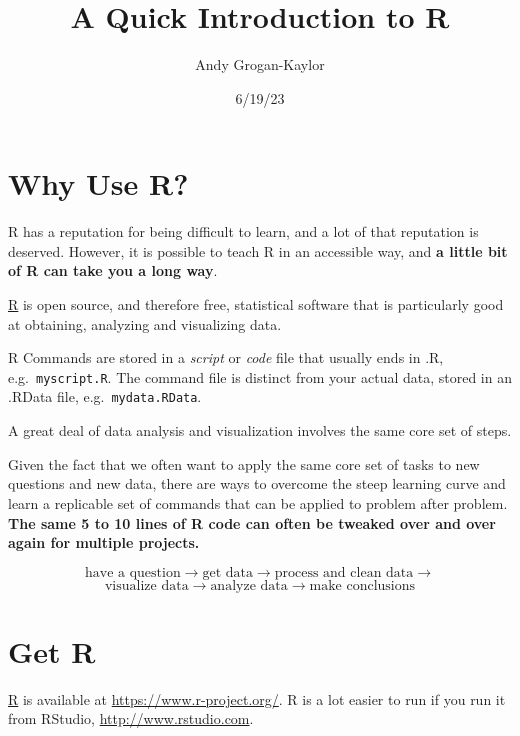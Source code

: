 \documentclass[
  letterpaper,
  DIV=11,
  numbers=noendperiod]{scrartcl}
\title{A Quick Introduction to R}
\author{Andy Grogan-Kaylor}
\date{6/19/23}
\begin{document}
\maketitle
\ifdefined\Shaded\renewenvironment{Shaded}{\begin{tcolorbox}[interior hidden, boxrule=0pt, borderline west={3pt}{0pt}{shadecolor}, frame hidden, enhanced, sharp corners, breakable]}{\end{tcolorbox}}\fi

\hypertarget{why-use-r}{%
\section{Why Use R?}\label{why-use-r}}

R has a reputation for being difficult to learn, and a lot of that
reputation is deserved. However, it is possible to teach R in an
accessible way, and \textbf{a little bit of R can take you a long way}.

\href{https://www.r-project.org/}{R} is open source, and therefore free,
statistical software that is particularly good at obtaining, analyzing
and visualizing data.

R Commands are stored in a \emph{script} or \emph{code} file that
usually ends in .R, e.g.~\texttt{myscript.R}. The command file is
distinct from your actual data, stored in an .RData file,
e.g.~\texttt{mydata.RData}.

A great deal of data analysis and visualization involves the same core
set of steps.

Given the fact that we often want to apply the same core set of tasks to
new questions and new data, there are ways to overcome the steep
learning curve and learn a replicable set of commands that can be
applied to problem after problem. \textbf{The same 5 to 10 lines of R
code can often be tweaked over and over again for multiple projects.}

\[\text{have a question} \rightarrow \text{get data} \rightarrow \text{process and clean data} \rightarrow\]
\[\text{visualize data} \rightarrow \text{analyze data} \rightarrow \text{make conclusions}\]

\hypertarget{get-r}{%
\section{Get R}\label{get-r}}

\href{https://www.r-project.org/}{R} is available at
\url{https://www.r-project.org/}. R is a lot easier to run if you run it
from RStudio, \url{http://www.rstudio.com}.
\end{document}
